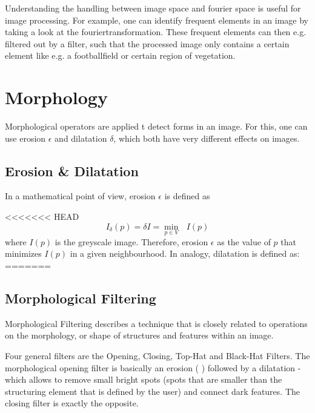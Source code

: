 Understanding the handling between image space and fourier space is useful for image processing. For example, one can identify frequent elements in an image by taking a look at the fouriertransformation. These frequent elements can then e.g. filtered out by a filter, such that the processed image only contains a certain element like e.g. a footballfield or certain region of vegetation.



\section{Morphology}
Morphological operators are applied t detect forms in an image. For this, one can use erosion $\epsilon$ and dilatation $\delta$, which both have very different effects on images. 

\subsection{Erosion \& Dilatation}
In a mathematical point of view, erosion $\epsilon$ is defined as

<<<<<<< HEAD
\begin{equation*}
I_{\delta}(p)=\delta I = \underset{p \in V}\min \text{ } I(p)
\end{equation*}
where $I(p)$ is the greyscale image. Therefore, erosion $\epsilon$ as the value of $p$ that minimizes $I(p)$ in a given neighbourhood. In analogy, dilatation is defined as:
=======
\subsection{Morphological Filtering}
Morphological Filtering describes a technique that is closely related to operations on the morphology, or shape of structures and features within an image.

Four general filters are the Opening, Closing, Top-Hat and Black-Hat Filters. The morphological opening filter is basically an erosion ( ) followed by a dilatation - which allows to remove small bright spots (spots that are smaller than the structuring element that is defined by the user) and connect dark features. The closing filter is exactly the opposite.


